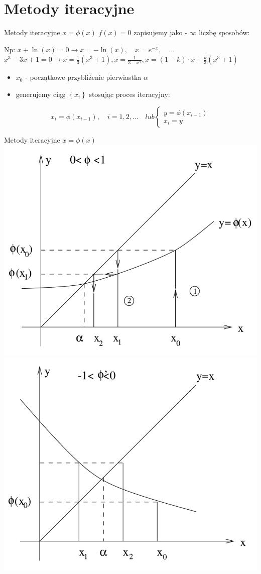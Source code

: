 \section{Metody iteracyjne}
\begin{frame}{Metody iteracyjne $x = \phi(x)$}
	$f(x) = 0$ zapisujemy jako  - $\infty$ liczbę sposobów:\linebreak
	
	Np:\linebreak
	$x + \ln(x) = 0 \rightarrow x = -\ln(x),\quad x = e^{-x},\quad \ldots$
	$x^{3} - 3x + 1 = 0 \rightarrow x = \frac{1}{3}(x^{3} + 1), x = \frac{1}{3 - x^{2}}, x = (1 - k) \cdot x + \frac{k}{3}(x^{3} + 1)$
	
	\begin{itemize}
		\item $x_{0}$ - początkowe przybliżenie pierwiastka $\alpha$
		\item generujemy ciąg $\left\{x_{i}\right\}$ stosując proces iteracyjny:
	\end{itemize}
	\[
		x_{i} = \phi(x_{i-1}),\quad i = 1, 2, \ldots \quad lub
		\begin{cases}
			y = \phi(x_{i-1})\\
			x_{i} = y
		\end{cases}
	\]
\end{frame}
\begin{frame}{Metody iteracyjne $x = \phi(x)$}
	\includegraphics[width=.45\linewidth]{img/7/7_3_1}
	\includegraphics[width=.45\linewidth]{img/7/7_3_2}
\end{frame}
